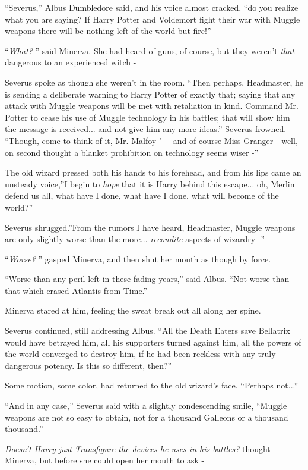 ``Severus,'' Albus Dumbledore said, and his voice almost cracked, ``do
you realize what you are saying? If Harry Potter and Voldemort fight
their war with Muggle weapons there will be nothing left of the world
but fire!''

``\emph{What?} '' said Minerva. She had heard of guns, of course, but they
weren't \emph{that} dangerous to an experienced witch -

Severus spoke as though she weren't in the room. ``Then perhaps,
Headmaster, he is sending a deliberate warning to Harry Potter of
exactly that; saying that any attack with Muggle weapons will be met
with retaliation in kind. Command Mr. Potter to cease his use of Muggle
technology in his battles; that will show him the message is
received... and not give him any more ideas.'' Severus frowned.
``Though, come to think of it, Mr. Malfoy "--- and of course Miss Granger -
well, on second thought a blanket prohibition on technology seems wiser
-''

The old wizard pressed both his hands to his forehead, and from his lips
came an unsteady voice,''I begin to \emph{hope} that it is Harry behind
this escape... oh, Merlin defend us all, what have I done, what
have I done, what will become of the world?''

Severus shrugged.''From the rumors I have heard, Headmaster, Muggle
weapons are only slightly worse than the more... \emph{recondite}
aspects of wizardry -''

``\emph{Worse?} '' gasped Minerva, and then shut her mouth as though by
force.

``Worse than any peril left in these fading years,'' said Albus. ``Not
worse than that which erased Atlantis from Time.''

Minerva stared at him, feeling the sweat break out all along her spine.

Severus continued, still addressing Albus. ``All the Death Eaters save
Bellatrix would have betrayed him, all his supporters turned against
him, all the powers of the world converged to destroy him, if he had
been reckless with any truly dangerous potency. Is this so different,
then?''

Some motion, some color, had returned to the old wizard's face.
``Perhaps not...''

``And in any case,'' Severus said with a slightly condescending smile,
``Muggle weapons are not so easy to obtain, not for a thousand Galleons
or a thousand thousand.''

\emph{Doesn't Harry just Transfigure the devices he uses in his
battles?} thought Minerva, but before she could open her mouth to ask -

